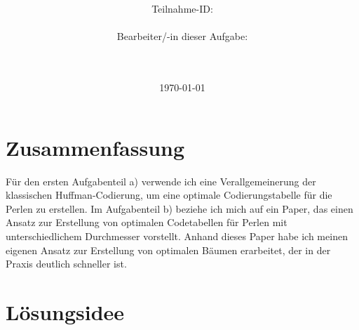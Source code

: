 \documentclass[a4paper,10pt,ngerman]{scrartcl}
\title{\textbf{\Huge\Aufgabe}}
\author{\LARGE Teilnahme-ID: \LARGE \TeilnahmeId \\\\
\LARGE Bearbeiter/-in dieser Aufgabe: \\
\LARGE \Name\\\\}
\date{\LARGE\today}
\begin{document}
    \maketitle
    \tableofcontents

    \section*{Zusammenfassung}
    Für den ersten Aufgabenteil a) verwende ich eine Verallgemeinerung der klassischen Huffman-Codierung, um eine optimale Codierungstabelle für die Perlen zu erstellen.
    Im Aufgabenteil b) beziehe ich mich auf ein Paper, das einen Ansatz zur Erstellung von optimalen Codetabellen für Perlen mit unterschiedlichem Durchmesser vorstellt.
    Anhand dieses Paper habe ich meinen eigenen Ansatz zur Erstellung von optimalen Bäumen erarbeitet, der in der Praxis deutlich schneller ist.



    \section{Lösungsidee}
\end{document}
